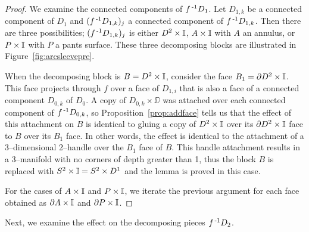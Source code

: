 \begin{proof}
	We examine the connected components of $f^{\,\text{-}1} D_1$.
	Let $D_{1,k}$ be a connected component of $D_1$ and $(f^{\,\text{-}1} D_{1,k})_j$ a connected component of $f^{\,\text{-}1} D_{1,k}$.
	Then there are three possibilities; $(f^{\,\text{-}1} D_{1,k})_j$ is either $D^2\times\mathbb{I}$, $A\times\mathbb{I}$ with $A$ an annulus, or $P\times\mathbb{I}$ with $P$ a pants surface.
	These three decomposing blocks are illustrated in Figure~\ref{fig:arcsleevepre}.
	
	When the decomposing block is $B=D^2\times\mathbb{I}$, consider the face $B_1=\partial D^2\times \mathbb{I}$.
	This face projects through $f$ over a face of $D_{1,i}$ that is also a face of a connected component $D_{0,k}$ of $D_0$.
	A copy of $D_{0,k}\times\DD$ was attached over each connected component of $f^{\,\text{-}1} D_{0,k}$, so Proposition~\ref{prop:addface} tells us that the effect of this attachment on $B$ is identical to gluing a copy of $D^2\times \mathbb{I}$ over its $\partial D^2\times \mathbb{I}$ face to $B$ over its $B_1$ face.
	In other words, the effect is identical to the attachment of a 3--dimensional 2--handle over the  $B_1$ face of $B$.
	This handle attachment results in a 3--manifold with no corners of depth greater than 1, thus the block $B$ is replaced with $S^2\times\mathbb{I}=S^2\times D^1$ and the lemma is proved in this case.
	
	For the cases of $A\times\mathbb{I}$ and $P\times\mathbb{I}$, we iterate the previous argument for each face obtained as $\partial A\times\mathbb{I}$ and $\partial P\times\mathbb{I}$.
\end{proof}

Next, we examine the effect on the decomposing pieces $f^{\,\text{-}1} D_2$.

